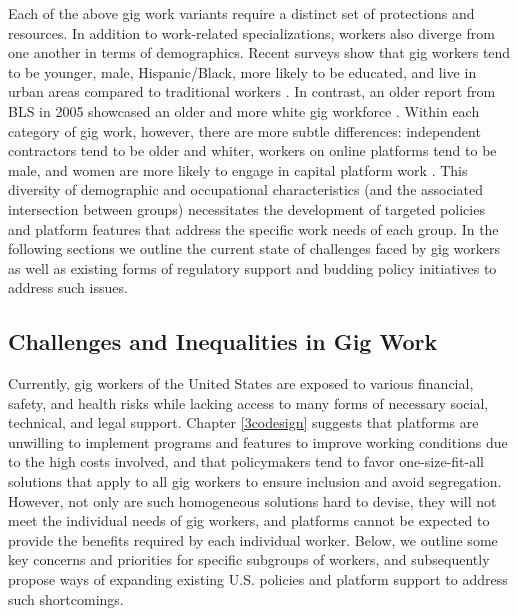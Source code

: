 Each of the above gig work variants require a distinct set of protections and resources. In addition to work-related specializations, workers also diverge from one another in terms of demographics. Recent surveys show that gig workers tend to be younger, male, Hispanic/Black, more likely to be educated, and live in urban areas compared to traditional workers \cite{noauthor_undated-tq,Gelles-Watnick2021-fz}. In contrast, an older report from BLS in 2005 showcased an older and more white gig workforce \cite{Howard2017-wd}. Within each category of gig work, however, there are more subtle differences: independent contractors tend to be older and whiter, workers on online platforms tend to be male, and women are more likely to engage in capital platform work \cite{Davidson2022-le}. This diversity of demographic and occupational characteristics (and the associated intersection between groups) necessitates the development of targeted policies and platform features that address the specific work needs of each group. In the following sections we outline the current state of challenges faced by gig workers as well as existing forms of regulatory support and budding policy initiatives to address such issues.

\subsection{Challenges and Inequalities in Gig Work}
Currently, gig workers of the United States are exposed to various financial, safety, and health risks while lacking access to many forms of necessary social, technical, and legal support. Chapter \ref{3codesign} suggests that platforms are unwilling to implement programs and features to improve working conditions due to the high costs involved, and that policymakers tend to favor one-size-fit-all solutions that apply to all gig workers to ensure inclusion and avoid segregation. However, not only are such homogeneous solutions hard to devise, they will not meet the individual needs of gig workers, and platforms cannot be expected to provide the benefits required by each individual worker. Below, we outline some key concerns and priorities for specific subgroups of workers, and subsequently propose ways of expanding existing U.S. policies and platform support to address such shortcomings.

